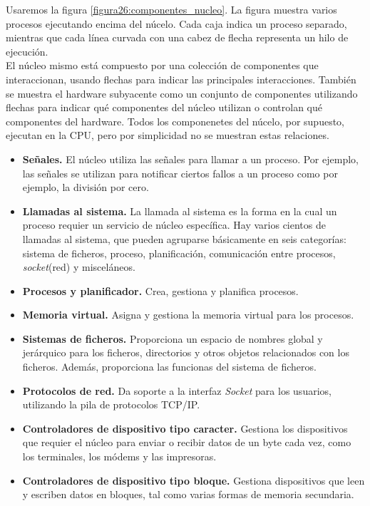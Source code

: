 \documentclass{article}
\begin{document}
				Usaremos la figura \ref{figura26:componentes_nucleo}. La figura muestra varios procesos ejecutando encima del núcelo. Cada caja indica un proceso separado, mientras que cada línea curvada con una cabez de flecha representa un hilo de ejecución. \\
				
				El núcleo mismo está compuesto por una colección de componentes que interaccionan, usando flechas para indicar las principales interacciones. También se muestra el hardware subyacente como un conjunto de componentes utilizando flechas para indicar qué componentes del núcleo utilizan o controlan qué componentes del hardware. Todos los componenetes del núcelo, por supuesto, ejecutan en la CPU, pero por simplicidad no se muestran estas relaciones.
				
				\begin{itemize}
				\item \textbf{Señales.} El núcleo utiliza las señales para llamar a un proceso. Por ejemplo, las señales se utilizan para notificar ciertos fallos a un proceso como por ejemplo, la división por cero.
				\item \textbf{Llamadas al sistema.} La llamada al sistema es la forma en la cual un proceso requier un servicio de núcleo específica. Hay varios cientos de llamadas al sistema, que pueden agruparse básicamente en seis categorías: sistema de ficheros, proceso, planificación, comunicación entre procesos, \textit{socket}(red) y misceláneos.
				\item \textbf{Procesos y planificador.} Crea, gestiona y planifica procesos.
				\item \textbf{Memoria virtual.} Asigna y gestiona la memoria virtual para los procesos.
				\item \textbf{Sistemas de ficheros.} Proporciona un espacio de nombres global y jerárquico para los ficheros, directorios y otros objetos relacionados con los ficheros. Además, proporciona las funcionas del sistema de ficheros.
				\item \textbf{Protocolos de red.} Da soporte a la interfaz \textit{Socket} para los usuarios, utilizando la pila de protocolos TCP/IP.
				\item \textbf{Controladores de dispositivo tipo caracter.} Gestiona los dispositivos que requier el núcleo para enviar o recibir datos de un byte cada vez, como los terminales, los módems y las impresoras.
				\item \textbf{Controladores de dispositivo tipo bloque.} Gestiona dispositivos que leen y escriben datos en bloques, tal como varias formas de memoria secundaria.

\end{itemize}
\end{document}
